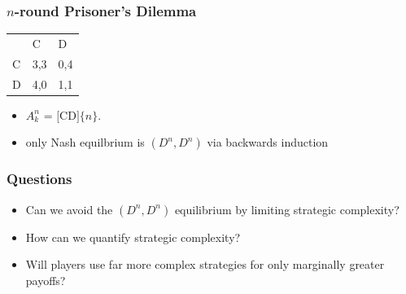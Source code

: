 \documentclass{beamer}
\begin{document}
\begin{frame}
	\frametitle{$n$-round Prisoner's Dilemma}
	\begin{table}[H]
		\centering
		\label{pdpayoffs}
		\begin{tabular}{lll}
			& C                        & D                        \\ \cline{2-3} 
			\multicolumn{1}{l|}{C} & \multicolumn{1}{l|}{3,3} & \multicolumn{1}{l|}{0,4} \\ \cline{2-3} 
			\multicolumn{1}{l|}{D} & \multicolumn{1}{l|}{4,0} & \multicolumn{1}{l|}{1,1} \\ \cline{2-3} 
		\end{tabular}
	\end{table}
	
	\begin{itemize}
		\item $A^n_k$ = $\lbrack \text{CD} \rbrack \lbrace n \rbrace$.
		\item only Nash equilbrium is $(D^n, D^n)$ via backwards induction
	\end{itemize}
	
	
	
	
\end{frame}

\begin{frame}
	\frametitle{Questions}
		\begin{itemize}
			\item Can we avoid the $(D^n, D^n)$ equilibrium by limiting strategic complexity?
			\item How can we quantify strategic complexity?
			\item Will players use far more complex strategies for only marginally greater payoffs?
		\end{itemize}
\end{frame}
\end{document}
